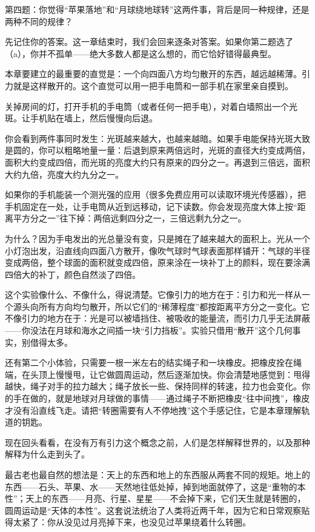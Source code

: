 第四题：你觉得“苹果落地”和“月球绕地球转”这两件事，背后是同一种规律，还是两种不同的规律？

先记住你的答案。这一章结束时，我们会回来逐条对答案。如果你第二题选了（a），你并不孤单——绝大多数人都是这么想的，而它恰好错得最典型。


本章要建立的最重要的直觉是：一个向四面八方均匀散开的东西，越远越稀薄。引力就是这样散开的。这个直觉可以用一把手电筒和一部手机在家里亲自摸到。

\begin{experiment}[光斑为什么会变大变暗]
关掉房间的灯，打开手机的手电筒（或者任何一把手电），对着白墙照出一个光斑。让手机贴在墙上，然后慢慢向后退。

你会看到两件事同时发生：光斑越来越大，也越来越暗。如果手电能保持光斑大致是圆的，你可以粗略地量一量：后退到原来两倍远时，光斑的直径大约变成两倍，面积大约变成四倍，而光斑的亮度大约只有原来的四分之一。再退到三倍远，面积大约九倍，亮度大约九分之一。

如果你的手机能装一个测光强的应用（很多免费应用可以读取环境光传感器），把手机固定在一处，让手电筒从近到远移动，记下读数。你会发现亮度大体上按“距离平方分之一”往下掉：两倍远剩四分之一，三倍远剩九分之一。

为什么？因为手电发出的光总量没有变，只是摊在了越来越大的面积上。光从一个小灯泡出发，沿直线向四面八方散开，像吹气球时气球表面那样铺开：气球的半径变成两倍，整个球面的面积就变成四倍，原来涂在一块补丁上的颜料，现在要涂满四倍大的补丁，颜色自然淡了四倍。

这个实验像什么、不像什么，得说清楚。它像引力的地方在于：引力和光一样从一个源头向所有方向均匀散开，所以它们的“稀薄程度”都按距离平方分之一变化。它不像引力的地方在于：光是可以被墙挡住、被吸收的能量流，而引力几乎无法屏蔽——你没法在月球和海水之间插一块“引力挡板”。实验只借用“散开”这个几何事实，别借得太多。
\end{experiment}

还有第二个小体验，只需要一根一米左右的结实绳子和一块橡皮。把橡皮拴在绳端，在头顶上慢慢甩，让它做圆周运动，然后逐渐加快。你会清楚地感觉到：甩得越快，绳子对手的拉力越大；绳子放长一些、保持同样的转速，拉力也会变化。你的手在做的，就是地球对月球做的事情——通过绳子不断把橡皮“往中间拽”，橡皮才没有沿直线飞走。请把“转圈需要有人不停地拽”这个手感记住，它是本章理解轨道的钥匙。


现在回头看看，在没有万有引力这个概念之前，人们是怎样解释世界的，以及那种解释为什么走到头了。

最古老也最自然的想法是：天上的东西和地上的东西服从两套不同的规矩。地上的东西——石头、苹果、水——天然地往低处掉，掉到地面就停了，这是“重物的本性”；天上的东西——月亮、行星、星星——不会掉下来，它们天生就是转圈的，圆周运动是“天体的本性”。这套说法统治了人类将近两千年，因为它和日常观察贴得太紧了：你从没见过月亮掉下来，也没见过苹果绕着什么转圈。

